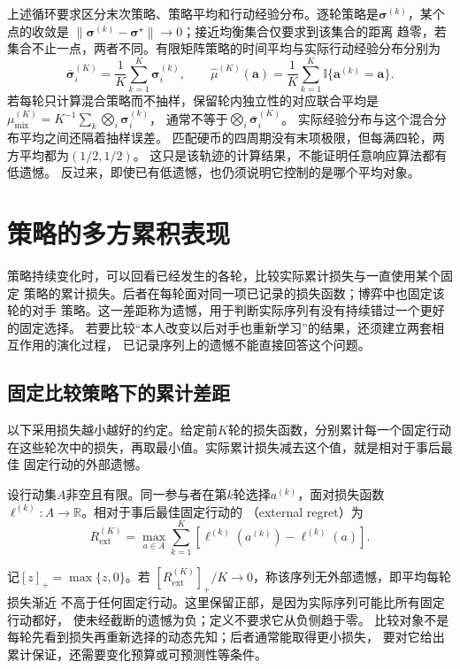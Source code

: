 上述循环要求区分末次策略、策略平均和行动经验分布。逐轮策略是\(\bm\sigma^{(k)}\)，某个点的收敛是
\(\|\bm\sigma^{(k)}-\bm\sigma^\star\|\to0\)；接近均衡集合仅要求到该集合的距离
趋零，若集合不止一点，两者不同。有限矩阵策略的时间平均与实际行动经验分布分别为
\[
  \bar{\bm\sigma}_i^{(K)}
  =\frac1K\sum_{k=1}^K\bm\sigma_i^{(k)},\qquad
  \widehat\mu^{(K)}(\bm a)
  =\frac1K\sum_{k=1}^K\mathbb I\{\bm a^{(k)}=\bm a\}.
\]
若每轮只计算混合策略而不抽样，保留轮内独立性的对应联合平均是
\(\mu_{\mathrm{mix}}^{(K)}=K^{-1}\sum_k\bigotimes_i\bm\sigma_i^{(k)}\)，
通常不等于\(\bigotimes_i\bar{\bm\sigma}_i^{(K)}\)。
实际经验分布与这个混合分布平均之间还隔着抽样误差。
匹配硬币的四周期没有末项极限，但每满四轮，两方平均都为\((1/2,1/2)\)。
这只是该轨迹的计算结果，不能证明任意响应算法都有低遗憾。
反过来，即使已有低遗憾，也仍须说明它控制的是哪个平均对象。

\section{策略的多方累积表现}
\label{sec:game-regret-cfr}

策略持续变化时，可以回看已经发生的各轮，比较实际累计损失与一直使用某个固定
策略的累计损失。后者在每轮面对同一项已记录的损失函数；博弈中也固定该轮的对手
策略。这一差距称为遗憾，用于判断实际序列有没有持续错过一个更好的固定选择。
若要比较“本人改变以后对手也重新学习”的结果，还须建立两套相互作用的演化过程，
已记录序列上的遗憾不能直接回答这个问题。

\subsection{固定比较策略下的累计差距}
\label{sec:game-regret-comparators}

以下采用损失越小越好的约定。给定前\(K\)轮的损失函数，分别累计每一个固定行动
在这些轮次中的损失，再取最小值。实际累计损失减去这个值，就是相对于事后最佳
固定行动的外部遗憾。
\begin{definition}[外部遗憾]
\label{def:game-external-regret}
设行动集\(A\)非空且有限。同一参与者在第\(k\)轮选择\(a^{(k)}\)，面对损失函数
\(\ell^{(k)}:A\to\mathbb R\)。相对于事后最佳固定行动的
（external regret）为
\begin{equation}
  R_{\mathrm{ext}}^{(K)}
  =\max_{a\in A}\sum_{k=1}^K
    [\ell^{(k)}(a^{(k)})-\ell^{(k)}(a)].
  \label{eq:game-external-regret}
\end{equation}
\end{definition}
记\([z]_+=\max\{z,0\}\)。若
\([R_{\mathrm{ext}}^{(K)}]_+/K\to0\)，称该序列无外部遗憾，即平均每轮损失渐近
不高于任何固定行动。这里保留正部，是因为实际序列可能比所有固定行动都好，
使未经截断的遗憾为负；定义不要求它从负侧趋于零。
比较对象不是每轮先看到损失再重新选择的动态先知；后者通常能取得更小损失，
要对它给出累计保证，还需要变化预算或可预测性等条件。

